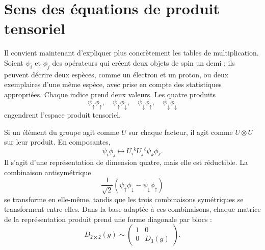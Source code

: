 \begin{classroomqa}
\end{classroomqa}

\section{Sens des équations de produit tensoriel}

Il convient maintenant d’expliquer plus concrètement les tables de multiplication. Soient \(\psi_i\) et \(\phi_j\) des opérateurs qui créent deux objets de spin un demi ; ils peuvent décrire deux espèces, comme un électron et un proton, ou deux exemplaires d’une même espèce, avec prise en compte des statistiques appropriées. Chaque indice prend deux valeurs. Les quatre produits
\begin{equation}
\psi_\uparrow\phi_\uparrow,
\quad
\psi_\uparrow\phi_\downarrow,
\quad
\psi_\downarrow\phi_\uparrow,
\quad
\psi_\downarrow\phi_\downarrow
\end{equation}
engendrent l’espace produit tensoriel.

Si un élément du groupe agit comme \(U\) sur chaque facteur, il agit comme \(U\otimes U\) sur leur produit. En composantes,
\begin{equation}
\psi_i\phi_j
\longmapsto
U_i{}^kU_j{}^\ell\psi_k\phi_\ell.
\label{eq:l4-product-action}
\end{equation}
Il s’agit d’une représentation de dimension quatre, mais elle est réductible. La combinaison antisymétrique
\begin{equation}
\frac{1}{\sqrt2}
(\psi_\uparrow\phi_\downarrow
-\psi_\downarrow\phi_\uparrow)
\end{equation}
se transforme en elle-même, tandis que les trois combinaisons symétriques se transforment entre elles. Dans la base adaptée à ces combinaisons, chaque matrice de la représentation produit prend une forme diagonale par blocs :
\begin{equation}
D_{2\otimes2}(g)
\sim
\begin{pmatrix}
1&0\\
0&D_3(g)
\end{pmatrix}.
\label{eq:l4-spin-block-diagonal}
\end{equation}

